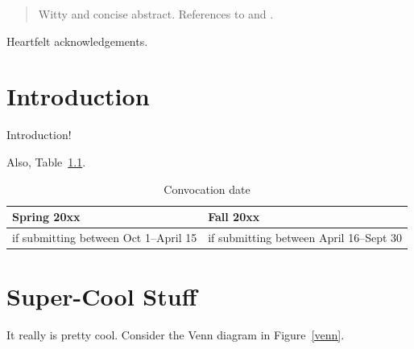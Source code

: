 \documentclass[12pt,openany,oneside]{report}
\begin{document}
\doublespacing

\begin{abstract}
  Witty and concise abstract.  References to \cite{MathStats38} and
  \cite{Physicist38}.
\end{abstract}


\begin{acknowledgement}
  Heartfelt acknowledgements.
\end{acknowledgement}

\beforebodyoftex


\tableofcontents

\listoftables

\listoffigures

\beginbodyoftex



\chapter{Introduction}

Introduction!

Also, Table~\ref{egtable}.

\begin{table}[htbp]
  \begin{center}
    \begin{tabular}{|p{4cm}|p{4cm}|}
      \hline
      Spring 20xx & Fall 20xx \\
      \hline
      \hline
      if submitting between Oct 1--April 15
      & if submitting between April 16--Sept 30\\
      \hline
    \end{tabular}
    \caption{Convocation date}
    \label{egtable}
  \end{center}
\end{table}


\chapter{Super-Cool Stuff}

It really is pretty cool.  Consider the Venn diagram in Figure~\ref{venn}.
\end{document}
